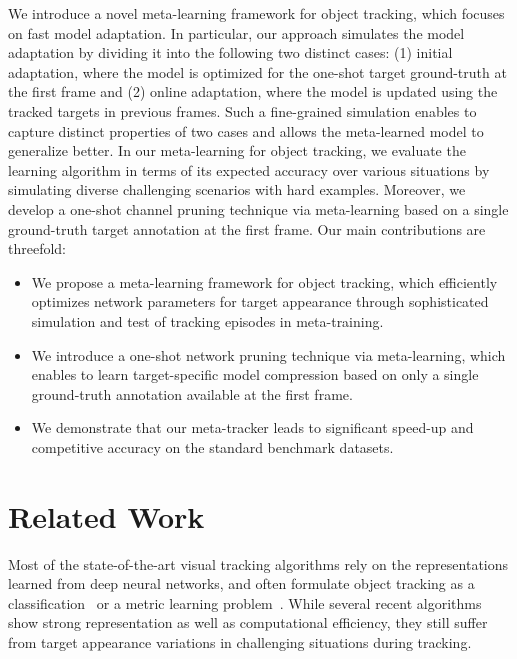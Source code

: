 \documentclass[letterpaper]{article} %
\begin{document}
We introduce a novel meta-learning framework for object tracking, which focuses on fast model adaptation.
In particular, our approach simulates the model adaptation by dividing it into the following two distinct cases: (1) initial adaptation, where the model is optimized for the one-shot target ground-truth at the first frame and (2) online adaptation, where the model is updated using the tracked targets in previous frames.
Such a fine-grained simulation enables to capture distinct properties of two cases and allows the meta-learned model to generalize better.
In our meta-learning for object tracking, we evaluate the learning algorithm in terms of its expected accuracy over various situations by simulating diverse challenging scenarios with hard examples. %
Moreover, we develop a one-shot channel pruning technique via meta-learning based on a single ground-truth target annotation at the first frame.
Our main contributions are threefold:
\begin{itemize}[label=$\bullet$]
  \item We propose a meta-learning framework for object tracking, which efficiently optimizes network parameters for target appearance through sophisticated simulation and test of tracking episodes in meta-training.
  \item We introduce a one-shot network pruning technique via meta-learning, which enables to learn target-specific model compression based on only a single ground-truth annotation available at the first frame.
  \item We demonstrate that our meta-tracker leads to significant speed-up and competitive accuracy on the standard benchmark datasets.
\end{itemize}

\section{Related Work}
\label{sec:related}

Most of the state-of-the-art visual tracking algorithms rely on the representations learned from deep neural networks, and often formulate object tracking as a classification~\cite{nam2016learningmulti,jung2018realtime} or a metric learning problem~\cite{luca2016fullycovolutional,zheng2018distractor}.
While several recent algorithms show strong representation as well as computational efficiency, they still suffer from target appearance variations in challenging situations during tracking.
\end{document}
